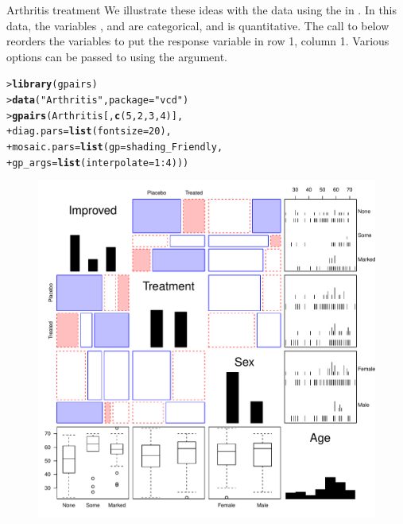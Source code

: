 \documentclass[10pt,krantz2]{krantz}\usepackage[]{graphicx}\usepackage[]{color}
\makeatletter
\newcommand{\hlnum}[1]{\textcolor[rgb]{0.686,0.059,0.569}{#1}}%
\newcommand{\hlstr}[1]{\textcolor[rgb]{0.192,0.494,0.8}{#1}}%
\newcommand{\hlopt}[1]{\textcolor[rgb]{0,0,0}{#1}}%
\newcommand{\hlstd}[1]{\textcolor[rgb]{0.345,0.345,0.345}{#1}}%
\newcommand{\hlkwc}[1]{\textcolor[rgb]{0.333,0.667,0.333}{#1}}%
\newcommand{\hlkwd}[1]{\textcolor[rgb]{0.737,0.353,0.396}{\textbf{#1}}}%
\newenvironment{kframe}{%
 \def\at@end@of@kframe{}%
 \ifinner\ifhmode%
  \def\at@end@of@kframe{\end{minipage}}%
  \begin{minipage}{\columnwidth}%
 \fi\fi%
 \def\FrameCommand##1{\hskip\@totalleftmargin \hskip-\fboxsep
 \colorbox{shadecolor}{##1}\hskip-\fboxsep
     \hskip-\linewidth \hskip-\@totalleftmargin \hskip\columnwidth}%
 \MakeFramed {\advance\hsize-\width
   \@totalleftmargin\z@ \linewidth\hsize
   \@setminipage}}%
 {\par\unskip\endMakeFramed%
 \at@end@of@kframe}
\newenvironment{knitrout}{}{} %
\renewenvironment{knitrout}{\small\renewcommand{\baselinestretch}{.85}}{} %
\makeatother
\begin{document}
\begin{Example}{Arthritis treatment}
We illustrate these ideas with the  data using the
 in .
In this data, the variables ,  and  are
categorical, and  is quantitative.
The call to  below reorders the variables to put the response variable
 in row 1, column 1. Various options can be passed to 
using the  argument.
\begin{knitrout}
\color{fgcolor}\begin{kframe}
\begin{alltt}
\hlstd{> }\hlkwd{library}\hlstd{(gpairs)}
\hlstd{> }\hlkwd{data}\hlstd{(}\hlstr{"Arthritis"}\hlstd{,} \hlkwc{package} \hlstd{=} \hlstr{"vcd"}\hlstd{)}
\hlstd{> }\hlkwd{gpairs}\hlstd{(Arthritis[,}\hlkwd{c}\hlstd{(}\hlnum{5}\hlstd{,} \hlnum{2}\hlstd{,} \hlnum{3}\hlstd{,} \hlnum{4}\hlstd{)],}
\hlstd{+ }       \hlkwc{diag.pars} \hlstd{=} \hlkwd{list}\hlstd{(}\hlkwc{fontsize} \hlstd{=} \hlnum{20}\hlstd{),}
\hlstd{+ }       \hlkwc{mosaic.pars} \hlstd{=} \hlkwd{list}\hlstd{(}\hlkwc{gp} \hlstd{= shading_Friendly,}
\hlstd{+ }                          \hlkwc{gp_args} \hlstd{=} \hlkwd{list}\hlstd{(}\hlkwc{interpolate} \hlstd{=} \hlnum{1} \hlopt{:} \hlnum{4}\hlstd{)))}
\end{alltt}
\end{kframe}\begin{figure}[!htb]

\centerline{\includegraphics[width=.9\textwidth]{ch05/fig/arth-gpairs-1} }


\end{figure}
\end{knitrout}
\end{Example}
\end{document}
